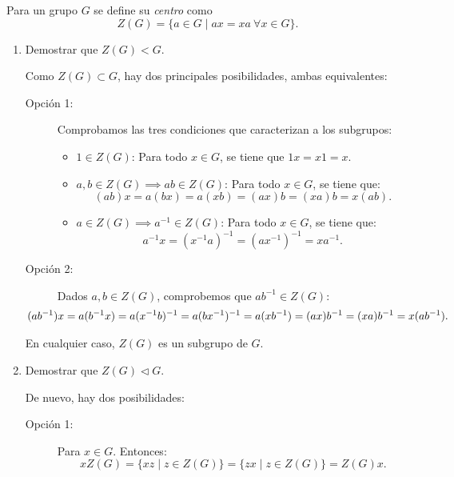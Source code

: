 \begin{ejercicio}\label{ej:4.4}
    Para un grupo $G$ se define su \emph{centro} como
    \[
        Z(G) = \{a\in G\mid ax=xa\ \forall x\in G\}.
    \]
    \begin{enumerate}
        \item Demostrar que $Z(G)< G$.
        
        Como $Z(G)\subset G$, hay dos principales posibilidades, ambas equivalentes:
        \begin{description}
            \item[Opción 1:]
            Comprobamos las tres condiciones que caracterizan a los subgrupos:
            \begin{itemize}
                \item $1\in Z(G)$: Para todo $x\in G$, se tiene que $1x=x1=x$.
                \item $a,b\in Z(G)\implies ab\in Z(G)$: Para todo $x\in G$, se tiene que:
                \begin{equation*}
                    (ab)x = a(bx) = a(xb) = (ax)b = (xa)b = x(ab).
                \end{equation*}
                \item $a\in Z(G)\implies a^{-1}\in Z(G)$: Para todo $x\in G$, se tiene que:
                \begin{equation*}
                    a^{-1}x = (x^{-1}a)^{-1} = (ax^{-1})^{-1} = xa^{-1}.
                \end{equation*}
            \end{itemize}

            \item[Opción 2:]
            
            Dados $a,b\in Z(G)$, comprobemos que $ab^{-1}\in Z(G)$:
            \begin{align*}
                \hspace{-1cm}(ab^{-1})x &= a(b^{-1}x) = a(x^{-1}b)^{-1} = a(bx^{-1})^{-1} = a(xb^{-1}) = (ax)b^{-1} = (xa)b^{-1} = x(ab^{-1}).
            \end{align*}
        \end{description}

        En cualquier caso, $Z(G)$ es un subgrupo de $G$.
        \item Demostrar que $Z(G)\lhd G$.
        
        De nuevo, hay dos posibilidades:
        \begin{description}
            \item[Opción 1:]
            Para $x\in G$. Entonces:
            \begin{equation*}
                xZ(G) = \{xz\mid z\in Z(G)\} = \{zx\mid z\in Z(G)\} = Z(G)x.
            \end{equation*}


\end{description}
\end{enumerate}
\end{ejercicio}
